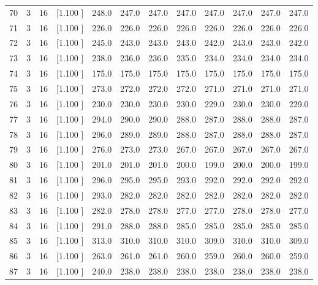 \documentclass[12pt,a4paper]{article}
\begin{document}
\begin{center}
{\begin{tabular}{r r r r r r r r r r r r}
  70&  3& 16&[1.100     ]&   248.0&   247.0&   247.0&   247.0&   247.0&   247.0&   247.0&   247.0\\[-0.02in]
  71&  3& 16&[1.100     ]&   226.0&   226.0&   226.0&   226.0&   226.0&   226.0&   226.0&   226.0\\[-0.02in]
  72&  3& 16&[1.100     ]&   245.0&   243.0&   243.0&   243.0&   242.0&   243.0&   243.0&   242.0\\[-0.02in]
  73&  3& 16&[1.100     ]&   238.0&   236.0&   236.0&   235.0&   234.0&   234.0&   234.0&   234.0\\[-0.02in]
  74&  3& 16&[1.100     ]&   175.0&   175.0&   175.0&   175.0&   175.0&   175.0&   175.0&   175.0\\[-0.02in]
  75&  3& 16&[1.100     ]&   273.0&   272.0&   272.0&   272.0&   271.0&   271.0&   271.0&   271.0\\[-0.02in]
  76&  3& 16&[1.100     ]&   230.0&   230.0&   230.0&   230.0&   229.0&   230.0&   230.0&   229.0\\[-0.02in]
  77&  3& 16&[1.100     ]&   294.0&   290.0&   290.0&   288.0&   287.0&   288.0&   288.0&   287.0\\[-0.02in]
  78&  3& 16&[1.100     ]&   296.0&   289.0&   289.0&   288.0&   287.0&   288.0&   288.0&   287.0\\[-0.02in]
  79&  3& 16&[1.100     ]&   276.0&   273.0&   273.0&   267.0&   267.0&   267.0&   267.0&   267.0\\[-0.02in]
  80&  3& 16&[1.100     ]&   201.0&   201.0&   201.0&   200.0&   199.0&   200.0&   200.0&   199.0\\[-0.02in]
  81&  3& 16&[1.100     ]&   296.0&   295.0&   295.0&   293.0&   292.0&   292.0&   292.0&   292.0\\[-0.02in]
  82&  3& 16&[1.100     ]&   293.0&   282.0&   282.0&   282.0&   282.0&   282.0&   282.0&   282.0\\[-0.02in]
  83&  3& 16&[1.100     ]&   282.0&   278.0&   278.0&   277.0&   277.0&   278.0&   278.0&   277.0\\[-0.02in]
  84&  3& 16&[1.100     ]&   291.0&   288.0&   288.0&   285.0&   285.0&   285.0&   285.0&   285.0\\[-0.02in]
  85&  3& 16&[1.100     ]&   313.0&   310.0&   310.0&   310.0&   309.0&   310.0&   310.0&   309.0\\[-0.02in]
  86&  3& 16&[1.100     ]&   263.0&   261.0&   261.0&   260.0&   259.0&   260.0&   260.0&   259.0\\[-0.02in]
  87&  3& 16&[1.100     ]&   240.0&   238.0&   238.0&   238.0&   238.0&   238.0&   238.0&   238.0\\[-0.02in]

\end{tabular}}
\end{center}
\end{document}
